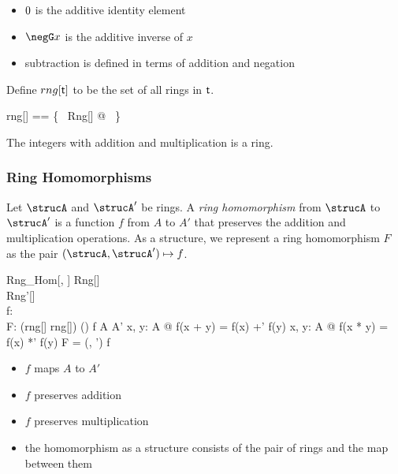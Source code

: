 \documentclass{amsart}
\begin{document}
\begin{itemize}
	\item $0$ is the additive identity element
	\item $\negG x$ is the additive inverse of $x$
	\item subtraction is defined in terms of addition and negation
\end{itemize}

Define $rng[\mathsf{t}]$ to be the set of all rings in $\mathsf{t}$.

\begin{zed}
	rng[\genT] == \{~ Rng[\genT] @ \strucA ~\}
\end{zed}

\begin{example}
The integers with addition and multiplication is a ring.
\end{example}

\subsubsection{Ring Homomorphisms}

Let $\strucA$ and $\strucA'$ be rings.
A \textit{ring homomorphism} from $\strucA$ to $\strucA'$ is a function $f$ from $A$ to $A'$ 
that preserves the addition and multiplication operations.
As a structure, we represent a ring homomorphism $F$ as the pair $(\strucA, \strucA') \mapsto f$.

\begin{schema}{Rng\_Hom}[\genT, \genU]
	Rng[\genT] \\
	Rng'[\genU] \\
	f: \genT \pfun \genU \\
	F: (rng[\genT] \cross rng[\genU]) \cross (\genT \pfun \genU)
\where
	f \in A \fun A'
\also
	\forall x, y: A @ f(x + y) = f(x) +' f(y)
\also
	\forall x, y:	 A @ f(x * y) = f(x) *' f(y)
\also
	F = (\strucA, \strucA') \mapsto f
\end{schema}

\begin{itemize}
	\item $f$ maps $A$ to $A'$
	\item $f$ preserves addition
	\item $f$ preserves multiplication
	\item the homomorphism as a structure consists of the pair of rings and the map between them
\end{itemize}
\end{document}
